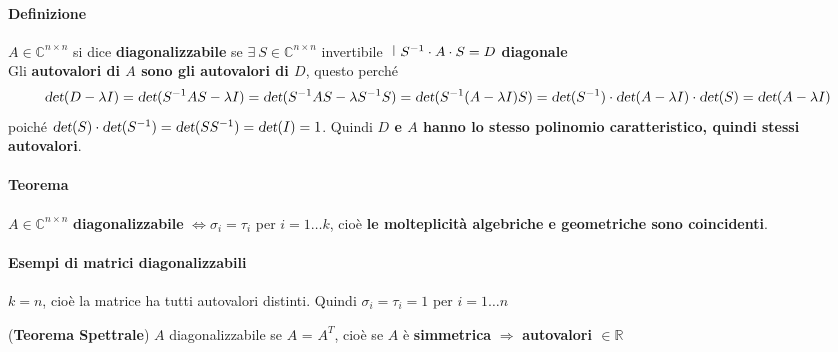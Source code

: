 \documentclass[10pt]{book}
\begin{document}
\paragraph{Definizione} $A \in \mathbb{C}^{n \times n}$ si dice \textbf{diagonalizzabile} se $\exists \:S \in \mathbb{C}^{n \times n}$ invertibile $\:\:\vline\:\:S^{-1}\cdot A\cdot S = D$ \textbf{diagonale}\\
Gli \textbf{autovalori di $A$ sono gli autovalori di $D$}, questo perché $$\textsl{det}(D - \lambda I) = \textsl{det}(S^{-1}AS - \lambda I) = \textsl{det}(S^{-1}AS - \lambda S^{-1}S) = \textsl{det}(S^{-1}(A - \lambda I)S) = \textsl{det}(S^{-1})\cdot\textsl{det}(A - \lambda I)\cdot\textsl{det}(S) = \textsl{det}(A - \lambda I)$$ poiché $\textsl{det}(S)\cdot\textsl{det}(S^{-1}) = \textsl{det}(SS^{-1}) = \textsl{det}(I) = 1$. Quindi \textbf{$D$ e $A$ hanno lo stesso polinomio caratteristico, quindi stessi autovalori}.
\pagebreak
\paragraph{Teorema} $A \in \mathbb{C}^{n \times n}$ \textbf{diagonalizzabile} $\Leftrightarrow \sigma_i = \tau_i$ per $i = 1\ldots k$, cioè \textbf{le molteplicità algebriche e geometriche sono coincidenti}.
\paragraph{Esempi di matrici diagonalizzabili}
\begin{list}{}{}
	\item $k = n$, cioè la matrice ha tutti autovalori distinti. Quindi $\sigma_i = \tau_i = 1$ per $i = 1 \ldots n$
	\item (\textbf{Teorema Spettrale}) $A$ diagonalizzabile se $A$ = $A^T$, cioè se $A$ è \textbf{simmetrica} $\Rightarrow$ \textbf{autovalori $\in \mathbb{R}$}
\end{list}
\end{document}
